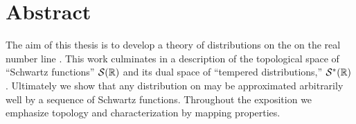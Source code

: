 \chapter*{Abstract}
  The aim of this thesis is to develop a theory of distributions on the on the real number line \R.
  This work culminates in a description of the topological space of ``Schwartz functions'' $\mathcal{S}(\mathbb{R})$ and its dual space of ``tempered distributions,'' $\mathcal{S}^*(\mathbb{R})$.
  Ultimately we show that any distribution on \R may be approximated arbitrarily well by a sequence of Schwartz functions.
  Throughout the exposition we emphasize topology and characterization by mapping properties.
